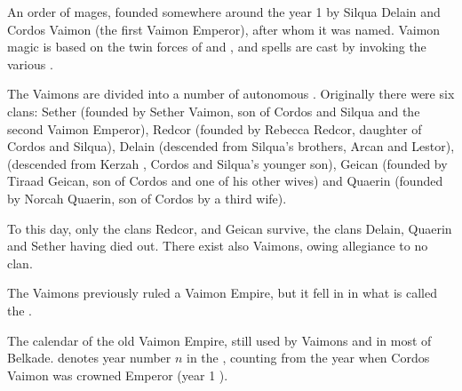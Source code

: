 \begin{gloss}
\begin{comment}
\subsubsection{V-Z}
\end{comment}

An order of \human{} mages, founded somewhere around the year 1 \IC{} by Silqua Delain and Cordos Vaimon (the first Vaimon Emperor), after whom it was named. Vaimon magic is based on the twin forces of \iquin{} and \nieur, and spells are cast by invoking the various \Archons{}. 


The Vaimons are divided into a number of autonomous . Originally there were six clans: Sether (founded by Sether Vaimon, son of Cordos and Silqua and the second Vaimon Emperor), Redcor (founded by Rebecca Redcor, daughter of Cordos and Silqua), Delain (descended from Silqua's brothers, Arcan and Lestor), \Irgel{} (descended from Kerzah \Irgel, Cordos and Silqua's younger son), Geican (founded by Tiraad Geican, son of Cordos and one of his other wives) and Quaerin (founded by Norcah Quaerin, son of Cordos by a third wife). 

To this day, only the clans Redcor, \Yrgell{} and Geican survive, the clans Delain, Quaerin and Sether having died out. There exist also  Vaimons, owing allegiance to no clan.

The Vaimons previously ruled a Vaimon Empire, but it fell in  in what is called the \quo{\Darkfall}. 

%



\label{Vaimon Calendar}
The calendar of the old Vaimon Empire, still used by Vaimons and in most of Belkade.  denotes year number $n$ in the \ImperialCalendar, counting from the year when Cordos Vaimon was crowned Emperor (year 1 \IC{}). 


\end{gloss}

